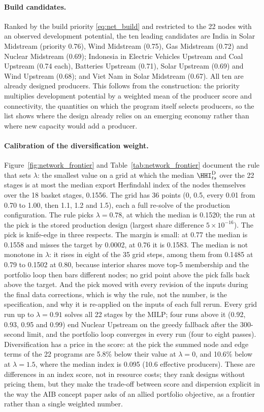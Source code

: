 \paragraph{Build candidates.} Ranked by the build priority \eqref{eq:net_build} and restricted to
the 22 nodes with an observed development potential, the ten leading candidates are India in
Solar Midstream (priority 0.76), Wind Midstream (0.75), Gas Midstream (0.72) and Nuclear
Midstream (0.69); Indonesia in Electric Vehicles Upstream and Coal Upstream (0.74 each), Batteries
Upstream (0.71), Solar Upstream (0.69) and Wind Upstream (0.68); and Viet Nam in Solar Midstream
(0.67). All ten are already designed producers. This follows from the construction: the priority
multiplies development potential by a weighted mean of the producer score and connectivity, the
quantities on which the program itself selects producers, so the list shows where the design
already relies on an emerging economy rather than where new capacity would add a producer.

\paragraph{Calibration of the diversification weight.} Figure~\ref{fig:network_frontier} and
Table~\ref{tab:network_frontier} document the rule that sets $\lambda$: the smallest value on a
grid at which the median $\HHI^{\mathrm{D}}_{ts}$ over the 22 stages is at most the median export
Herfindahl index of the nodes themselves over the 18 basket stages, 0.1556. The grid has 36
points (0, 0.5, every 0.01 from 0.70 to 1.00, then 1.1, 1.2 and 1.5), each a full re-solve of the
production configuration. The rule picks $\lambda=0.78$, at which the median is 0.1520; the run
at the pick is the stored production design (largest share difference $5\times10^{-16}$). The
pick is knife-edge in three respects. The margin is small: at 0.77 the median is 0.1558 and
misses the target by 0.0002, at 0.76 it is 0.1583. The median is not monotone in $\lambda$: it
rises in eight of the 35 grid steps, among them from 0.1485 at 0.79 to 0.1502 at 0.80, because
interior shares move top-5 membership and the portfolio loop then bars different nodes; no grid
point above the pick falls back above the target. And the pick moved with every revision of the
inputs during the final data corrections, which is why the rule, not the number, is the
specification, and why it is re-applied on the inputs of each full rerun. Every grid run up to
$\lambda=0.91$ solves all 22 stages by the MILP; four runs above it (0.92, 0.93, 0.95 and 0.99)
end Nuclear Upstream on the greedy fallback after the 300-second limit, and the portfolio loop
converges in every run (four to eight passes). Diversification has a price in the score: at the
pick the summed node and edge terms of the 22 programs are 5.8\% below their value at $\lambda=0$,
and 10.6\% below at $\lambda=1.5$, where the median index is 0.095 (10.6 effective producers).
These are differences in an index score, not in resource costs; they rank designs without pricing
them, but they make the trade-off between score and dispersion explicit in the way the AIB concept
paper asks of an allied portfolio objective, as a frontier rather than a single weighted
number. %

